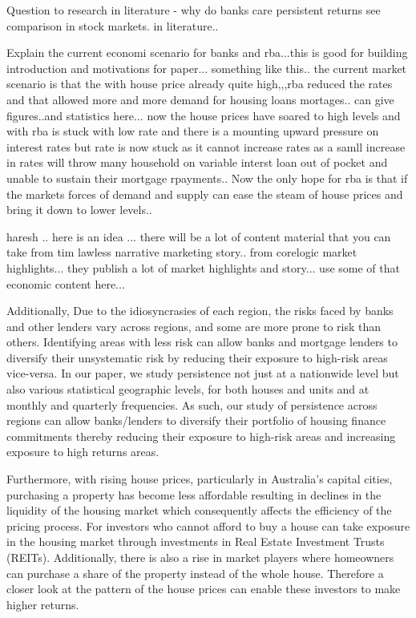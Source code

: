 \documentclass[AEJ,reqno, draftmode]{AEA}
\begin{document}
    Question to research in literature - why do banks care persistent returns see comparison in stock markets. in literature..


Explain the current economi scenario for banks and rba...this is good for building introduction and motivations for paper...
something like this.. the current market scenario is that the with house price already quite high,,,rba reduced the rates and that allowed more and more demand for housing loans mortages.. can give figures..and statistics here... now the house prices have soared to high levels and with rba is stuck with low rate and there is a mounting upward pressure on interest rates but rate is now stuck as it cannot increase rates as a samll increase in rates will throw many household on variable interst loan out of pocket and unable to sustain their mortgage rpayments.. Now the only hope for rba is that if the markets forces of demand and supply can ease the steam of house prices and bring it down to lower levels.. 

haresh .. here is an idea ... there will be a lot of content material that you can take from tim lawless narrative marketing story.. from corelogic market highlights... they publish a lot of market highlights and story... use some of that economic content here...












Additionally, Due to the idiosyncrasies of each region, the risks faced by banks and other lenders vary across regions, and some are more prone to risk than others. Identifying areas with less risk can allow banks and mortgage lenders to diversify their unsystematic risk by reducing their exposure to high-risk areas vice-versa. In our paper, we study persistence not just at a nationwide level but also various statistical geographic levels, for both houses and units and at monthly and quarterly frequencies. As such, our study of persistence across regions can allow banks/lenders to diversify their portfolio of housing finance commitments thereby reducing their exposure to high-risk areas and increasing exposure to high returns areas.

Furthermore, with rising house prices, particularly in Australia's capital cities, purchasing a property has become less affordable resulting in declines in the liquidity of the housing market which consequently affects the efficiency of the pricing process. For investors who cannot afford to buy a house can take exposure in the housing market through investments in Real Estate Investment Trusts (REITs). Additionally, there is also a rise in market players where homeowners can purchase a share of the property instead of the whole house. Therefore a closer look at the pattern of the house prices can enable these investors to make higher returns.
\end{document}
